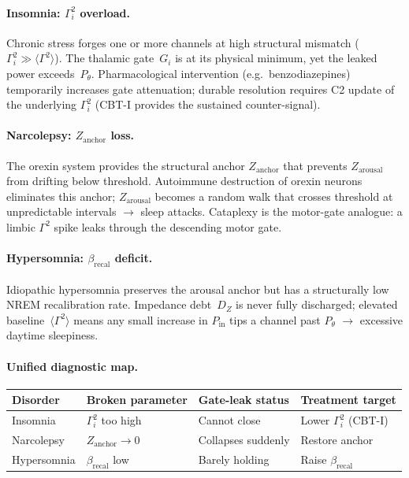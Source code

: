 \documentclass[aps,pre,twocolumn,superscriptaddress,floatfix]{revtex4-2}
\begin{document}
\paragraph{Insomnia: $\Gamma_i^2$ overload.}
Chronic stress forges one or more channels at high
structural mismatch
($\Gamma_i^2 \gg \langle\Gamma^2\rangle$).
The thalamic gate~$G_i$ is at its physical minimum,
yet the leaked power exceeds~$P_\theta$.
Pharmacological intervention (e.g.\ benzodiazepines)
temporarily increases gate attenuation;
durable resolution requires C2 update of the
underlying $\Gamma_i^2$
(CBT-I provides the sustained counter-signal).

\paragraph{Narcolepsy: $Z_{\mathrm{anchor}}$ loss.}
The orexin system provides the structural anchor
$Z_{\mathrm{anchor}}$ that prevents
$Z_{\mathrm{arousal}}$ from drifting below threshold.
Autoimmune destruction of orexin neurons eliminates
this anchor; $Z_{\mathrm{arousal}}$ becomes a random
walk that crosses threshold at unpredictable
intervals $\to$ sleep attacks.
Cataplexy is the motor-gate analogue:
a limbic $\Gamma^2$ spike leaks through the
descending motor gate.

\paragraph{Hypersomnia: $\beta_{\mathrm{recal}}$
deficit.}
Idiopathic hypersomnia preserves the arousal anchor
but has a structurally low NREM recalibration rate.
Impedance debt~$D_Z$ is never fully discharged;
elevated baseline~$\langle\Gamma^2\rangle$ means
any small increase in $P_{\mathrm{in}}$ tips a
channel past $P_\theta$ $\to$ excessive daytime
sleepiness.

\paragraph{Unified diagnostic map.}

\begin{center}
\begin{tabular}{@{}llll@{}}
\hline
\textbf{Disorder} & \textbf{Broken parameter}
  & \textbf{Gate-leak status}
  & \textbf{Treatment target} \\
\hline
Insomnia
  & $\Gamma_i^2$ too high
  & Cannot close
  & Lower $\Gamma_i^2$ (CBT-I) \\
Narcolepsy
  & $Z_{\text{anchor}} \to 0$
  & Collapses suddenly
  & Restore anchor \\
Hypersomnia
  & $\beta_{\text{recal}}$ low
  & Barely holding
  & Raise $\beta_{\text{recal}}$ \\
\hline
\end{tabular}
\end{center}
\end{document}
